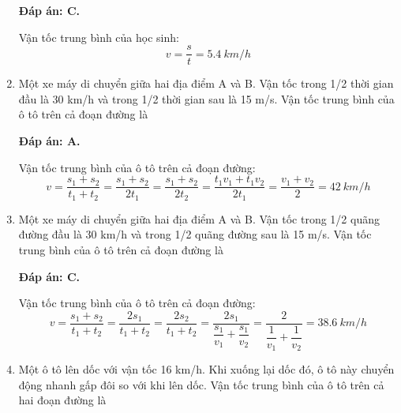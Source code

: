 \begin{enumerate}[label=\bfseries Câu \arabic*:]
{	}
	
	\hideall
	{\textbf{Đáp án: C.}
		
		Vận tốc trung bình của học sinh:
		$$v=\dfrac{s}{t} = \SI{5.4}{km/h}$$	
		
	}
	\item {}
	
	
	{Một xe máy di chuyển giữa hai địa điểm A và B. Vận tốc trong 1/2 thời gian đầu là 30 km/h và trong 1/2 thời gian sau là 15 m/s. Vận tốc trung bình của ô tô trên cả đoạn đường là
		
	}
	
	\hideall
	{\textbf{Đáp án: A.}
		
		Vận tốc trung bình của ô tô trên cả đoạn đường:
		$$v=\dfrac{s_1+s_2}{t_1+t_2} = \dfrac{s_1+s_2}{2t_1} = \dfrac{s_1+s_2}{2t_2} = \dfrac{t_1v_1+t_1v_2}{2t_1} = \dfrac{v_1+v_2}{2} = \SI{42}{km/h}$$
		
	}
	
	\item {}
	
	
	{Một xe máy di chuyển giữa hai địa điểm A và B. Vận tốc trong 1/2 quãng đường đầu là 30 km/h và trong 1/2 quãng đường sau là 15 m/s. Vận tốc trung bình của ô tô trên cả đoạn đường là
	}
	
	\hideall
	{	\textbf{Đáp án: C.}
		
		Vận tốc trung bình của ô tô trên cả đoạn đường:
		$$v=\dfrac{s_1+s_2}{t_1+t_2} = \dfrac{2s_1}{t_1+t_2} = \dfrac{2s_2}{t_1+t_2} = \dfrac{2s_1}{\dfrac{s_1}{v_1}+\dfrac{s_1}{v_2}} = \dfrac{2}{\dfrac{1}{v_1}+\dfrac{1}{v_2}} = \SI{38.6}{km/h}$$
		
	}
	\item {}
	
	
	{Một ô tô lên dốc với vận tốc 16 km/h. Khi xuống lại dốc đó, ô tô này chuyển động nhanh gấp đôi so với khi lên dốc. Vận tốc trung bình của ô tô trên cả hai đoạn đường là
	}
	

\end{enumerate}
